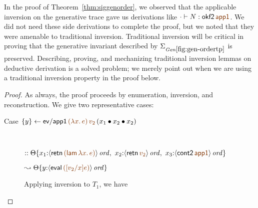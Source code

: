 \bigskip
In the proof of Theorem~\ref{thm:siggenorder}, we observed that the
applicable inversion on the generative trace gave us derivations like
$\cdot \vdash N : {{\sf okf2}\,\lf{\sf app1}}$. We did not need these
side derivations to complete the proof, but we noted that they were
amenable to traditional inversion. Traditional inversion will be
critical in proving that the generative invariant described by
$\siggenordertp$ is preserved. Describing, proving, and mechanizing
traditional inversion lemmas on deductive derivation is a solved
problem; we merely point out when we are using a traditional inversion
property in the proof below.


\begin{proof} As always, the proof proceeds by enumeration, inversion,
  and reconstruction. We give two representative cases: 

\begin{description}

\item 
  [Case $\trstep{y}{{\sf ev/app1}\,\lf{(\lambda x.\,e)}\,\lf{v_2}\,(\tfuser{x_1}{\tfuser{x_2}{x_2}})}$]~

\qquad
  $::
   \tackon{\Theta}{x_1{:}\istrue{\susp{{\sf retn}\,\lf{({\sf lam}\,\lambda x.\,e)}}}, ~
                   x_2{:}\istrue{\susp{{\sf retn}\,\lf{v_2}}}, ~
                   x_3{:}\istrue{\susp{{\sf cont2}\,\lf{\sf app1}}}}$

\qquad\qquad
  $\leadsto
   \tackon{\Theta}{y{:}\istrue{\susp{{\sf eval}\,\lf{([v_2/x]e)}}}}$

\medskip
Applying inversion to $T_1$, we have


\end{description}
\end{proof}

